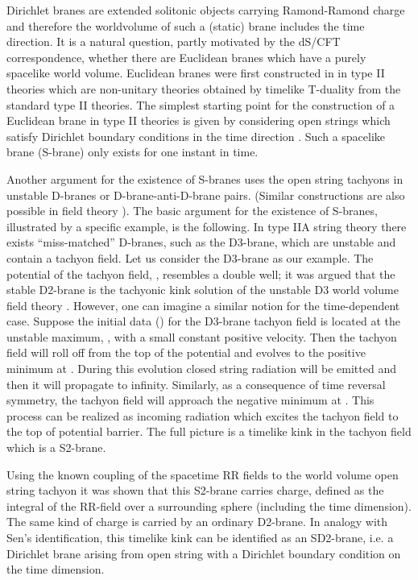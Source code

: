 \documentclass[a4paper,aps,nofootinbib,showpacs,preprint]{revtex4}
\begin{document}
Dirichlet branes \cite{Po95} are extended solitonic objects
carrying Ramond-Ramond charge and therefore the worldvolume of
such a (static) brane includes the time direction. It is a natural
question, partly motivated by the dS/CFT correspondence, whether
there are Euclidean branes which have a purely spacelike world
volume. Euclidean branes were first constructed in
\cite{Hu98,Hu01} in type II\myHighlight{$^*$}\coordHE{} theories which are non-unitary
theories obtained by timelike T-duality from the standard type II
theories. The simplest starting point for the construction of a
Euclidean brane in type II theories is given by considering open
strings which satisfy Dirichlet boundary conditions in the time
direction \cite{GS02}. Such a spacelike brane (S-brane) only
exists for one instant in time.

Another argument for the existence of S-branes uses the open
string tachyons in unstable D-branes or D-brane-anti-D-brane
pairs. (Similar constructions are also possible in field theory
\cite{FGGRS95}). The basic argument for the existence of S-branes,
illustrated by a specific example, is the following. In type IIA
string theory there exists ``miss-matched'' D-branes, such as the
D3-brane, which are unstable and contain a tachyon field. Let us
consider the D3-brane as our example. The potential of the tachyon
field, \coordHE{}, resembles a double well; it was argued that the
stable D2-brane is the tachyonic kink solution of the unstable D3
world volume field theory \cite{Se99}. However, one can imagine a
similar notion for the time-dependent case. Suppose the initial
data (\coordHE{}) for the D3-brane tachyon field is located at the
unstable maximum, \coordHE{}, with a small constant positive velocity.
Then the tachyon field will roll off from the top of the potential
and evolves to the positive minimum at \coordHE{}. During this
evolution closed string radiation will be emitted and then it will
propagate to infinity. Similarly, as a consequence of time
reversal symmetry, the tachyon field will approach the negative
minimum at \coordHE{}. This process can be realized as incoming
radiation which excites the tachyon field to the top of potential
barrier. The full picture is a timelike kink in the tachyon field
which is a S2-brane.

Using the known coupling of the spacetime RR fields to the world
volume open string tachyon it was shown that this S2-brane carries
charge, defined as the integral of the RR-field over a surrounding
sphere (including the time dimension). The same kind of charge is
carried by an ordinary D2-brane. In analogy with Sen's
identification, this timelike kink can be identified as an
SD2-brane, i.e. a Dirichlet brane arising from open string with a
Dirichlet boundary condition on the time dimension.
\end{document}
